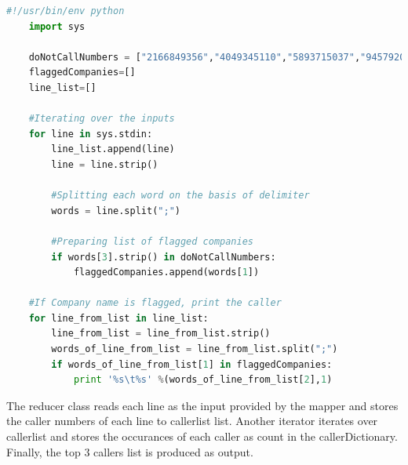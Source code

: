 \documentclass[a4paper, 10pt]{article}
\begin{document}
\begin{lstlisting}[language=Python, caption=Mapper for problem 4]
    #!/usr/bin/env python
    import sys
    
    doNotCallNumbers = ["2166849356","4049345110","5893715037","9457920329"]
    flaggedCompanies=[]
    line_list=[]
    
    #Iterating over the inputs
    for line in sys.stdin:
        line_list.append(line)
        line = line.strip()

        #Splitting each word on the basis of delimiter
        words = line.split(";")

        #Preparing list of flagged companies
        if words[3].strip() in doNotCallNumbers:
            flaggedCompanies.append(words[1])
    
    #If Company name is flagged, print the caller
    for line_from_list in line_list:
        line_from_list = line_from_list.strip()
        words_of_line_from_list = line_from_list.split(";")
        if words_of_line_from_list[1] in flaggedCompanies:
            print '%s\t%s' %(words_of_line_from_list[2],1)        
\end{lstlisting}

The reducer class reads each line as the input provided by the mapper and stores the caller numbers of each line to callerlist list.
Another iterator iterates over callerlist and stores the occurances of each caller as count in the callerDictionary. Finally, the top 3 callers list is produced as output.
\end{document}
